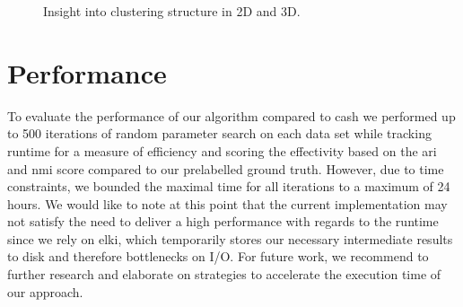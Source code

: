 \begin{figure}
\begin{minipage}[t]{.5\textwidth}
    \end{minipage}%
    \caption{Insight into clustering structure in 2D and 3D.}
    \label{fig:evalsetup}
\end{figure}


\section{Performance}
 To evaluate the performance of our algorithm compared to \gls{cash} we performed up to 500 iterations of random parameter search on each data set while tracking runtime for a measure of efficiency and scoring the effectivity based on the \gls{ari} and \gls{nmi} score compared to our prelabelled ground truth. However, due to time constraints, we bounded the maximal time for all iterations to a maximum of 24 hours.  We would like to note at this point that the current implementation may not satisfy the need to deliver a high performance with regards to the runtime since we rely on \gls{elki}, which temporarily stores our necessary intermediate results to disk and therefore bottlenecks on I/O. For future work, we recommend to further research and elaborate on strategies to accelerate the execution time of our approach. 
 

